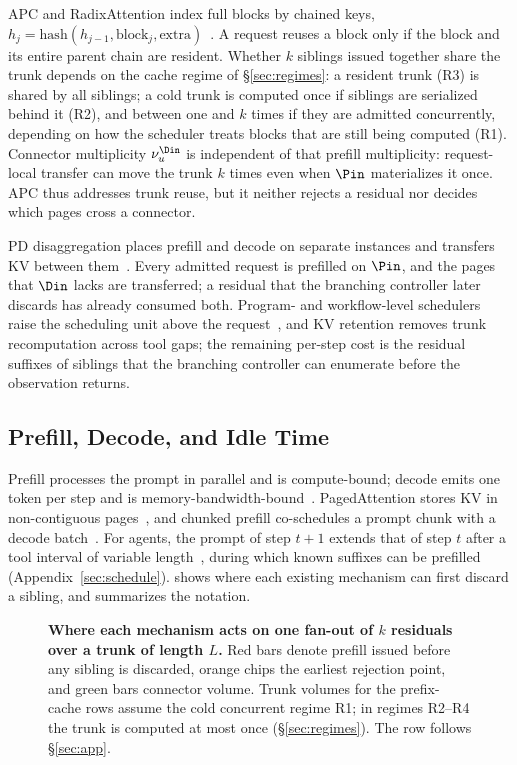 APC and RadixAttention index full blocks by chained keys, $h_j=\mathrm{hash}(h_{j-1},\text{block}_j,\text{extra})$~\cite{vllm,sglang}.
A request reuses a block only if the block and its entire parent chain are resident.
Whether $k$ siblings issued together share the trunk depends on the cache regime of \S\ref{sec:regimes}: a resident trunk (R3) is shared by all siblings; a cold trunk is computed once if siblings are serialized behind it (R2), and between one and $k$ times if they are admitted concurrently, depending on how the scheduler treats blocks that are still being computed (R1).
Connector multiplicity $\nu_u^{\Din}$ is independent of that prefill multiplicity: request-local transfer can move the trunk $k$ times even when $\Pin$ materializes it once.
APC thus addresses trunk reuse, but it neither rejects a residual nor decides which pages cross a connector.

PD disaggregation places prefill and decode on separate instances and transfers KV between them~\cite{distserve,splitwise}.
Every admitted request is prefilled on $\Pin$, and the pages that $\Din$ lacks are transferred; a residual that the branching controller later discards has already consumed both.
Program- and workflow-level schedulers raise the scheduling unit above the request~\cite{autellix,thunderagent,continuum,mori}, and KV retention removes trunk recomputation across tool gaps; the remaining per-step cost is the residual suffixes of siblings that the branching controller can enumerate before the observation returns.

\subsection{Prefill, Decode, and Idle Time}
Prefill processes the prompt in parallel and is compute-bound; decode emits one token per step and is memory-bandwidth-bound~\cite{orca,distserve,splitwise}.
PagedAttention stores KV in non-contiguous pages~\cite{vllm}, and chunked prefill co-schedules a prompt chunk with a decode batch~\cite{sarathi}.
For agents, the prompt of step $t{+}1$ extends that of step $t$ after a tool interval of variable length~\cite{continuum,mori}, during which known suffixes can be prefilled (Appendix~\ref{sec:schedule}).
 shows where each existing mechanism can first discard a sibling, and  summarizes the notation.

\begin{figure}[t]
\centering
\resizebox{\textwidth}{!}{}
\caption{\textbf{Where each mechanism acts on one fan-out of $k$ residuals over a trunk of length $L$.}
Red bars denote prefill issued before any sibling is discarded, orange chips the earliest rejection point, and green bars connector volume.
Trunk volumes for the prefix-cache rows assume the cold concurrent regime R1; in regimes R2--R4 the trunk is computed at most once (\S\ref{sec:regimes}).
The \sys{} row follows \S\ref{sec:app}.}
\label{fig:trad}
\end{figure}

